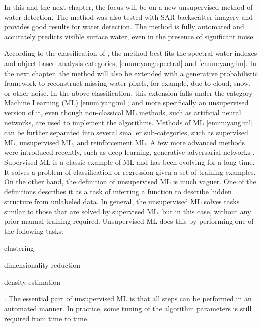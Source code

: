 In this and the next chapter, the focus will be on a new unsupervised method of water detection. The method was also tested with SAR backscatter imagery and provides good results for water detection. The method is fully automated and accurately predicts visible surface water, even in the presence of significant noise.

According to the classification of \citet{yang2015landsat}, the method best fits the spectral water indexes and object-based analysis categories, \ref{enum:yang:spectral} and \ref{enum:yang:im}. In the next chapter, the method will also be extended with a generative probabilistic framework to reconstruct missing water pixels, for example, due to cloud, snow, or other noise. In the above classification, this extension falls under the category Machine Learning (ML) \ref{enum:yang:ml}; and more specifically an unsupervised version of it, even though non-classical ML methods, such as artificial neural networks, are used to implement the algorithms. Methods of ML \ref{enum:yang:ml} can be further separated into several smaller sub-categories, such as supervised ML, unsupervised ML, and reinforcement ML. A few more advanced methods were introduced recently, such as deep learning, generative adversarial networks \citet{goodfellow2014generative}. Supervised ML is a classic example of ML and has been evolving for a long time. It solves a problem of classification or regression given a set of training examples. On the other hand, the definition of unsupervised ML is much vaguer. One of the definitions describes it as a task of inferring a function to describe hidden structure from unlabeled data. In general, the unsupervised ML solves tasks similar to those that are solved by supervised ML, but in this case, without any prior manual training required. Unsupervised ML does this by performing one of the following tasks: 
\begin{enumerate*}[label=(\emph{\arabic*})]
	\item \label {enum:ml2:clustering} clustering
	\item \label {enum:ml2:dimentionality-reduction} dimensionality reduction
	\item \label {enum:ml2:density} density estimation
\end{enumerate*}.
The essential part of unsupervised ML is that all steps can be performed in an automated manner. In practice, some tuning of the algorithm parameters is still required from time to time.

